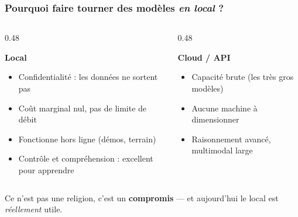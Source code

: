 \documentclass[
	11pt,
	aspectratio=169
]{beamer}
\begin{document}
\begin{frame}
    \frametitle{Pourquoi faire tourner des modèles \emph{en local} ?}
    \begin{columns}[t]
        \begin{column}{0.48\textwidth}
            \begin{block}{\centering \textbf{Local}}
                \begin{itemize}\setlength\itemsep{0.3em}
                    \item Confidentialité : les données ne sortent pas
                    \item Coût marginal nul, pas de limite de débit
                    \item Fonctionne hors ligne (démos, terrain)
                    \item Contrôle et compréhension : excellent pour apprendre
                \end{itemize}
            \end{block}
        \end{column}
        \begin{column}{0.48\textwidth}
            \begin{exampleblock}{\centering \textbf{Cloud / API}}
                \begin{itemize}\setlength\itemsep{0.3em}
                    \item Capacité brute (les très gros modèles)
                    \item Aucune machine à dimensionner
                    \item Raisonnement avancé, multimodal large
                \end{itemize}
            \end{exampleblock}
        \end{column}
    \end{columns}
    \vspace{0.1cm}
    \begin{center}
        Ce n'est pas une religion, c'est un \textbf{compromis} --- et aujourd'hui le local est \emph{réellement} utile.
    \end{center}
\end{frame}
\end{document}
